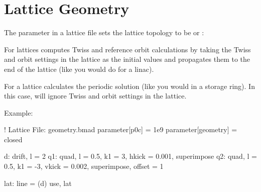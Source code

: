 \documentclass{hitec}
\newcommand{\Section}[1]{\section{#1}\vspace*{-1ex}}
\begin{document}
\Section{Lattice Geometry}
\label{s:lat.geom}

The  parameter in a lattice file sets the lattice topology to be
 or :
\vspace*{-20pt}
\begin{description}
\item {} \Newline 
For  lattices \bmad computes Twiss and reference orbit calculations by taking the
Twiss and orbit settings in the lattice as the initial values and propagates them to the
end of the lattice (like you would do for a linac).
\item {} \Newline 
For a  lattice \bmad calculates the periodic solution (like you would in a storage ring).
In this case, \bmad will ignore Twiss and orbit settings in the lattice.
\end{description}

Example:
\begin{code}
! Lattice File: geometry.bmad
parameter[p0c] = 1e9
parameter[geometry] = closed

d: drift, l = 2
q1: quad, l = 0.5, k1 = 3, hkick = 0.001, superimpose
q2: quad, l = 0.5, k1 = -3, vkick = 0.002, superimpose, offset = 1

lat: line = (d)
use, lat
\end{code}
\end{document}
